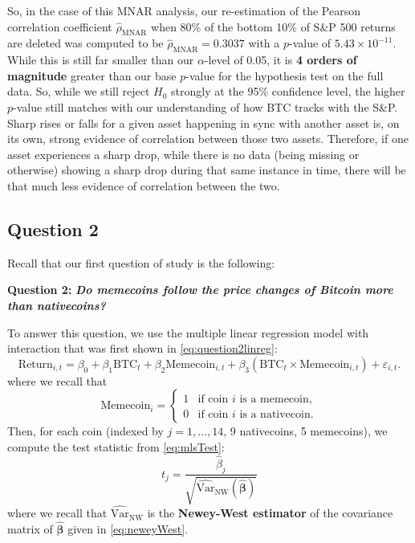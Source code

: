 \documentclass[12pt]{article}
\begin{document}
		
		So, in the case of this MNAR analysis, our re-estimation of the Pearson correlation coefficient $\hat{\rho}_{\mathrm{MNAR}}$ when 80\% of the bottom 10\% of S\&P 500 returns are deleted was computed to be $\hat{\rho}_{\mathrm{MNAR}} = 0.3037$ with a $p$-value of $5.43 \times 10^{-11}$. While this is still far smaller than our $\alpha$-level of 0.05, it is \textbf{4 orders of magnitude} greater than our base $p$-value for the hypothesis test on the full data.  So, while we still reject $H_0$ strongly at the 95\% confidence level, the higher $p$-value still matches with our understanding of how BTC tracks with the S\&P. Sharp rises or falls for a given asset happening in sync with another asset is, on its own, strong evidence of correlation between those two assets. Therefore, if one asset experiences a sharp drop, while there is no data (being missing or otherwise) showing a sharp drop during that same instance in time, there will be that much less evidence of correlation between the two. 
		
		
		\subsection{Question 2}
		Recall that our first question of study is the following: 
		\begin{tcolorbox}[colback=green!5!white,colframe=green!75!black]
			\textbf{Question 2: } \textbf{\textit{Do memecoins follow the price changes of Bitcoin more than nativecoins?}}
		\end{tcolorbox}
		To answer this question, we use the multiple linear regression model with interaction that was first shown in \autoref{eq:question2linreg}: 
			\begin{equation}
				\label{eq:question2linreg2}
				\mathrm{Return}_{i,t} = \beta_0 + \beta_1 \mathrm{BTC}_t + \beta_2 \mathrm{Memecoin}_{i,t} + \beta_3 (\mathrm{BTC}_t \times \mathrm{Memecoin}_{i,t}) + \varepsilon_{i,t}. 
			\end{equation}
		where we recall that 
		\begin{equation*}
			\mathrm{Memecoin}_i = \begin{cases}1 & \text{if coin } i \text{ is a memecoin}, \\ 0 & \text{if coin } i \text{ is a nativecoin}.\end{cases}
		\end{equation*}
		Then, for each coin (indexed by $j = 1, \dots, 14$, 9 nativecoins, 5 memecoins), we compute  the test statistic from \autoref{eq:mlsTest}: $$t_j = \frac{\hat{\beta}_j}{\sqrt{\widehat{\mathrm{Var}}_{\mathrm{NW}}(\widehat{\boldsymbol \beta})}}$$ where we recall that  $\widehat{\mathrm{Var}}_{\mathrm{NW}}$ is the \textbf{Newey-West estimator} of the covariance matrix of $\widehat{\boldsymbol \beta}$ given in \autoref{eq:neweyWest}. 
		
\end{document}
